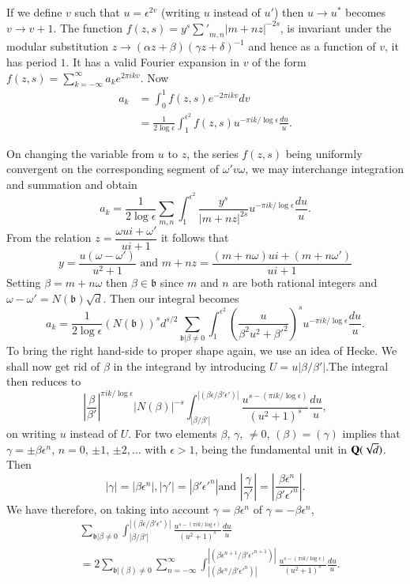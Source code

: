 If we define $v$ such that $u=\epsilon^{2v}$ (writing $u$ instead of
$u'$) then $u\to u^{\ast}$ becomes $v\to v+1$. The function
$f(z,s)=y^{s}{\mathop{\sum}'}_{m,n}|m+nz|^{-2s}$, is invariant under
the modular substitution $z\to (\alpha z+\beta)(\gamma z+\delta)^{-1}$
and hence as a function of $v$, it has period $1$. It has a valid
Fourier expansion in $v$ of the form
$f(z,s)=\sum\limits^{\infty}_{k=-\infty}a_{k}e^{2\pi ikv}$. Now 
\begin{align*}
a_{k} &= \int^{1}_{0}f(z,s)e^{-2\pi ikv}dv\\
&= \frac{1}{2\log \epsilon}\int^{\epsilon^{2}}_{1}f(z,s)u^{-\pi
  ik/\log \epsilon}\frac{du}{u}.  
\end{align*}

On changing the variable from $u$ to $z$, the series $f(z,s)$ being
uniformly convergent on the corresponding segment of $\omega'v\omega$,
we may interchange integration and summation and obtain
$$
a_{k}=\frac{1}{2\log
  \epsilon}\sum_{m,n}\int^{\epsilon^{2}}_{1}\frac{y^{s}}{|m+nz|^{2s}}u^{-\pi
  ik/\log \epsilon}\frac{du}{u}.
$$
From the relation $z=\dfrac{\omega ui+\omega'}{ui+1}$ it follows that
$$
y=\frac{u(\omega-\omega')}{u^{2}+1}\text{ and }
m+nz=\frac{(m+n\omega)ui+(m+n\omega')}{ui+1} 
$$
Setting $\beta=m+n\omega$ then $\beta\in \mathfrak{b}$ since $m$ and
$n$ are both rational integers and
$\omega-\omega'=N(\mathfrak{b})\sqrt{d}$. Then our integral becomes
$$
a_{k}=\frac{1}{2\log
  \epsilon}(N(\mathfrak{b}))^{s}d^{s/2}\sum_{\mathfrak{b}|\beta\neq
  0}\int^{\epsilon^{2}}_{1}\left(\frac{u}{\beta^{2}u^{2}+{\beta'}^{2}}\right)^{s}u^{-\pi
  ik/\log\epsilon}\frac{du}{u}. 
$$
To bring the right hand-side to proper shape again, we use an idea of
Hecke. We shall now get rid of $\beta$ in the integrand by introducing
$U=u|\beta/\beta'|$.\pageoriginale The integral then reduces to
$$
\left|\frac{\beta}{\beta'}\right|^{\pi
  ik/\log\epsilon}|N(\beta)|^{-s}\int^{|(\beta\epsilon/\beta'\epsilon')|}_{|\beta/\beta'|}\frac{u^{s-(\pi
    ik/\log \epsilon)}}{(u^{2}+1)^{s}}\frac{du}{u},
$$
on writing $u$ instead of $U$. For two elements $\beta$, $\gamma$,
$\neq 0$, $(\beta)=(\gamma)$ implies that
$\gamma=\pm\beta\epsilon^{n}$, $n=0$, $\pm 1$, $\pm 2,\ldots$ with
$\epsilon>1$, being the fundamental unit in $\mathbf{Q}(\sqrt{d})$. Then
$$
|\gamma|=|\beta\epsilon^{n}|,|\gamma'|=|\beta'{\epsilon'}^{n}|\text{
  and }
\left|\frac{\gamma}{\gamma'}\right|=\left|\frac{\beta\epsilon^{n}}{\beta'{\epsilon'}^{n}}\right|.
$$
We have therefore, on taking into account $\gamma=\beta\epsilon^{n}$
of $\gamma=-\beta\epsilon^{n}$,
\begin{align*}
& \sum_{\mathfrak{b}|\beta\neq
    0}\int^{|(\beta\epsilon/\beta'\epsilon')|}_{|\beta/\beta'|}
  \frac{u^{s-(\pi ik/\log\epsilon)}}{(u^{2}+1)^{s}}\frac{du}{u}\\
&= 2\sum_{\mathfrak{b}|(\beta)\neq
    0}\sum^{\infty}_{n=-\infty}\int^{|(\beta\epsilon^{n+1}/\beta'{\epsilon'}^{n+1})|}_{|(\beta\epsilon^{n}/\beta'{\epsilon'}^{n})|}\frac{u^{s-(\pi
      ik/\log\epsilon)}}{(u^{2}+1)^{s}}\frac{du}{u}. 
\end{align*}

